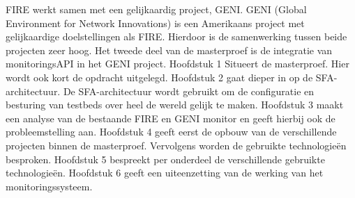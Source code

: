 \npar
FIRE werkt samen met een gelijkaardig project, GENI. GENI (Global Environment for Network Innovations) is een Amerikaans project met gelijkaardige doelstellingen als FIRE. Hierdoor is de samenwerking tussen beide projecten zeer hoog. Het tweede deel van de masterproef is de integratie van monitoringsAPI in het GENI project.
\npar
Hoofdstuk 1 Situeert de masterproef. Hier wordt ook kort de opdracht uitgelegd.
\npar
Hoofdstuk 2 gaat dieper in op de SFA-architectuur. De SFA-architectuur wordt gebruikt om de configuratie en besturing van testbeds over heel de wereld gelijk te maken.
\npar
Hoofdstuk 3 maakt een analyse van de bestaande FIRE en GENI monitor en geeft hierbij ook de probleemstelling aan.
\npar
Hoofdstuk 4 geeft eerst de opbouw van de verschillende projecten binnen de masterproef. Vervolgens worden de gebruikte technologie\"en besproken.
\npar
Hoofdstuk 5 bespreekt per onderdeel de verschillende gebruikte technologie\"en.
\npar
Hoofdstuk 6 geeft een uiteenzetting van de werking van het monitoringssysteem.